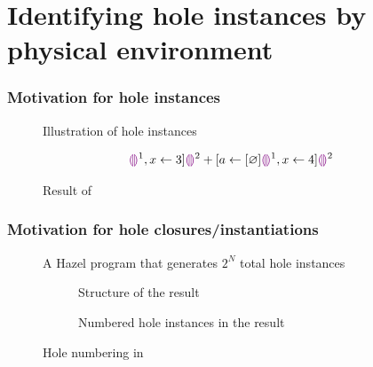 \documentclass{beamer}
\begin{document}
\section{Identifying hole instances by physical environment}

\begin{frame}
  \frametitle{Motivation for hole instances}

  \begin{figure}
    \caption{Illustration of hole instances}
    \label{fig:instance-illustration}
  \end{figure}

  \begin{figure}
    \centering
    \begin{equation*}
      [a\leftarrow[\varnothing]\hehole^1,x\leftarrow 3]\hehole^2
      + [a\leftarrow[\varnothing]\hehole^1,x\leftarrow 4]\hehole^2
    \end{equation*}
    \caption{Result of }
    \label{fig:hole-instance-result}
  \end{figure}
\end{frame}

\begin{frame}[allowframebreaks]
  \frametitle{Motivation for hole closures/instantiations}

  \begin{figure}
    \centering
    \caption{A Hazel program that generates $2^N$ total hole instances}
    \label{fig:hole-renumbering-problem}
  \end{figure}

  \begin{figure}
    \centering
    \begin{subfigure}[b]{0.3\textwidth}
      \centering
      \maxsizebox{\textwidth}{10em}{
        
      }
      \caption{Structure of the result}
      \label{fig:hole-renumbering-solution-structure}
    \end{subfigure}
    \qquad
    \begin{subfigure}[b]{0.6\textwidth}
      \centering
      \maxsizebox{\textwidth}{10em}{
        
      }
      \caption{Numbered hole instances in the result}
      \label{fig:hole-renumbered-result}
    \end{subfigure}
    \caption{Hole numbering in }
  \end{figure}
\end{frame}
\end{document}
